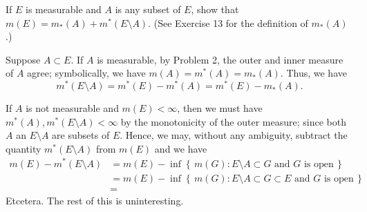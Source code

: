 \begin{problem}
  If $E$ is measurable and $A$ is any subset of $E$, show that
  $m(E)=m_*(A)+m^*(E\setminus A)$. (See Exercise 13 for the definition
  of $m_*(A)$.)
\end{problem}
\begin{solution}
  Suppose $A\subset E$. If $A$ is measurable, by Problem 2, the outer and
  inner measure of $A$ agree; symbolically, we have
  $m(A)=m^*(A)=m_*(A)$. Thus, we have
  \[
    m^*(E\setminus A)=m^*(E)-m^*(A)=m^*(E)-m_*(A).
  \]

  If $A$ is not measurable and $m(E)<\infty$, then
  we must have $m^*(A),m^*(E\setminus A)<\infty$ by the monotonicity
  of the outer measure; since both $A$ an $E\setminus A$ are subsets
  of $E$. Hence, we may, without any ambiguity, subtract the quantity
  $m^*(E\setminus A)$ from $m(E)$ and we have
  \begin{align*}
    m(E)-m^*(E\setminus A)
    &=m(E)
      -\inf\left\{\,m(G):\text{$E\setminus A\subset G$ and $G$ is
      open}\,\right\}\\
    &=m(E)
      -\inf\left\{\,m(G):\text{$E\setminus A\subset G\subset E$ and $G$ is
      open}\,\right\}\\
    &=
  \end{align*}
  Etcetera. The rest of this is uninteresting.
\end{solution}


